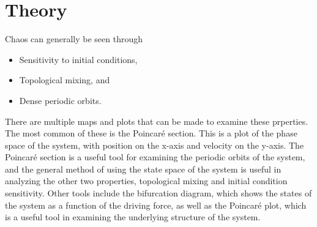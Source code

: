 \documentclass[11pt]{article} %
\begin{document}
\section{Theory}
    Chaos can generally be seen through
    \begin{itemize}
        \item Sensitivity to initial conditions,
        \item Topological mixing, and
        \item Dense periodic orbits.
    \end{itemize}
    There are multiple maps and plots that can be made to examine these prperties. 
    The most common of these is the Poincar\'e section. This is a plot of the phase 
    space of the system, with position on the x-axis and velocity 
    on the y-axis. The Poincar\'e section is a useful tool for examining the periodic 
    orbits of the system, and the general method of using the state space of the system 
    is useful in analyzing the other two properties, topological mixing and initial condition
    sensitivity. Other tools include the bifurcation diagram, which shows the states of the
    system as a function of the driving force, as well as the Poincar\'e plot, which is a useful
    tool in examining the underlying structure of the system. \cite{Strogatz2000}\\
\end{document}
